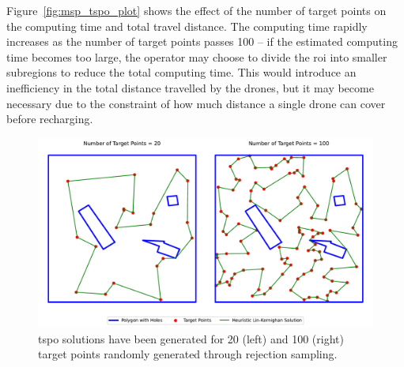Figure~\ref{fig:msp_tspo_plot} shows the effect of the number of target points on the computing time and total travel distance. The computing time rapidly increases as the number of target points passes 100 -- if the estimated computing time becomes too large, the operator may choose to divide the \gls{roi} into smaller subregions to reduce the total computing time. This would introduce an inefficiency in the total distance travelled by the drones, but it may become necessary due to the constraint of how much distance a single drone can cover before recharging. 


\begin{figure}[h!]
    \centering
    \includegraphics[width=\linewidth]{figs/Jihwan/TSPO_diff_targets.pdf}
    \caption[TSP-O Solution for Different Numbers of Target Points]
    {\gls{tspo} solutions have been generated for 20 (left) and 100 (right) target points randomly generated through rejection sampling.}
    \label{fig:msp_tspo_20_100}
\end{figure}

